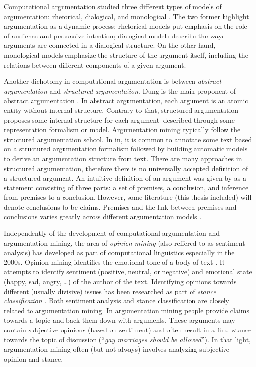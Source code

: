 Computational argumentation studied three different types of models of argumentation:
rhetorical, dialogical, and monological \citep{bentahar2010taxonomy}. 
The two former highlight argumentation as a dynamic process: rhetorical models
put emphasis on the role of audience and persuasive intention; dialogical 
models describe the ways arguments are connected in a dialogical structure. 
On the other hand, monological models emphasize the structure of the argument itself, 
including the relations between different components of a given argument. 

Another dichotomy in computational argumentation is between 
\emph{abstract argumentation} and \emph{structured argumentation}.
Dung is the main proponent of abstract argumentation \citep{dung1995acceptability,
bondarenko1997abstract}. In abstract argumentation, each argument is an
atomic entity without internal structure. Contrary to that, 
structured argumentation proposes some internal structure for each argument, 
described through some representation formalism or model. 
Argumentation mining typically follow the structured argumentation
school. In in, it is common to annotate some text based on a structured argumentation
formalism followed by building automatic models to derive an argumentation
structure from text. There are many approaches in structured argumentation,
therefore there is no universally accepted definition of a structured argument. 
An intuitive definition of an argument was given by \citet{walton1998new}
as a statement consisting of three parts: a set of premises, a conclusion, 
and inference from premises to a conclusion. However, some literature (this thesis
included) will denote conclusions to be claims. Premises and the link between premises
and conclusions varies greatly across different argumentation models
\citep{lippi2016argumentation}.

Independently of the development of computational argumentation and argumentation
mining, the area of \emph{opinion mining} (also reffered to as sentiment
analysis) has developed as part of computational linguistics especially in the
2000s. Opinion mining identifies the emotional tone of a body of text
\citep{pang2008opinion}.  It attempts to identify sentiment (positive, neutral,
or negative) and emotional state (happy, sad, angry, \dots) of the author of
the text.  Identifying opinions towards different (usually divisive) issues has
been researched as part of \emph{stance classification}
\citep{walker2012stance, hasan2013stance}.  Both sentiment analysis and stance
classification
are closely related to argumentation mining. In argumentation mining people
provide claims towards a topic and back them down with arguments. These
arguments may contain subjective opinions (based on sentiment) and often result
in a final stance towards the topic of discussion (``\emph{gay marriages
should be allowed}'').  In that light, argumentation mining often
(but not always) involves analyzing subjective opinion and stance. 

